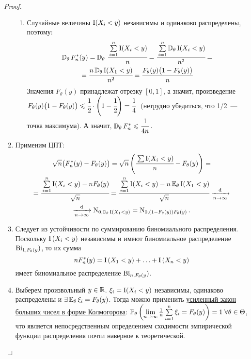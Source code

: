 \begin{proof}
\begin{enumerate}
\begin{enumerate}[label={\arabic*)}]
                \item Случайные величины $\operatorname{\mathrm{I}}(X_{i}<y)$ независимы и одинаково распределены, поэтому:
                \begin{multline*}
                    \operatorname{\mathbb{D}_{\theta}} F_{n}^{*}(y)
                    = \operatorname{\mathbb{D}_{\theta}} \, \cfrac{\sum\limits_{i=1}^{n} \operatorname{\mathrm{I}}(X_{i}<y)}{n}
                    = \cfrac{\sum\limits_{i=1}^{n} \operatorname{\mathbb{D}_{\theta}} \operatorname{\mathrm{I}}(X_{i}<y)}{n^{2}}
                    = \\
                    = \cfrac{n\operatorname{\mathbb{D}_{\theta}} \operatorname{\mathrm{I}}(X_{1}<y)}{n^{2}}
                    = \cfrac{F_{\theta}(y)\bigl(1-F_{\theta}(y)\bigr)}{n}
                \end{multline*}
                Значения $F_{\theta}(y)$ принадлежат отрезку $[0, 1]$, а значит, произведение $F_{\theta}(y)\bigl(1 - F_{\theta}(y)\bigr) \leqslant \cfrac{1}{2}\cdot\left(1 - \cfrac{1}{2}\right) = \cfrac{1}{4}~$ (нетрудно убедиться, что 1/2~--- точка максимума). 
                А значит, $\operatorname{\mathbb{D}_{\theta}} F_{n}^{*} \leqslant \cfrac{1}{4n}\,$. 
            \end{enumerate}
        \item 
            Применим ЦПТ:
            \begin{multline*}
                \sqrt{n}\bigl( F_{n}^{*}(y)-F_{\theta}(y) \bigr)
                = \sqrt{n}\left(\cfrac{\sum \operatorname{\mathrm{I}}(X_{i}<y)}{n}-F_{\theta}(y)\right) 
                = \\
                = \cfrac{\sum\limits_{i=1}^{n} \operatorname{\mathrm{I}}(X_{i}<y)-n F_{\theta}(y)}{\sqrt{n}} 
                = \cfrac{\sum\limits_{i=1}^{n} \operatorname{\mathrm{I}}(X_{i}<y)-n \operatorname{\operatorname{\mathbb{E}}_{\theta}}\operatorname{\mathrm{I}}(X_{1}<y)}{\sqrt{n}} 
                \xrightarrow[n \to \infty]{\text{d}} \\
                \xrightarrow[n \to \infty]{\text{d}} \operatorname{\mathrm{N}}_{0, \operatorname{\mathbb{D}_{\theta}}\operatorname{\mathrm{I}}(X_{1}<y)}
                = \operatorname{\mathrm{N}}_{0, (1-F_{\theta}(y))F_{\theta}(y)}.
            \end{multline*}
        \item 
            Следует из устойчивости по суммированию биномиального распределения. 
            Поскольку $\operatorname{\mathrm{I}}\left(X_{i}<y\right)$ независимы и имеют биномиальное распределение $\operatorname{\mathrm{Bi}}_{1, F_{\theta}(y})$, то их сумма
            \begin{equation*}
                n F_{n}^{*}(y)=\operatorname{\mathrm{I}}\left(X_{1}<y\right)+\ldots+\operatorname{\mathrm{I}}\left(X_{n}<y\right)
            \end{equation*}
            имеет биномиальное распределение $\operatorname{\mathrm{Bi}}_{n, F_{\theta}(y})$.
            
        \item 
            Выберем произвольный $y \in \mathbb{R}$. 
            $\xi_i = \operatorname{\mathrm{I}}(X_i < y)$ независимы, одинаково распределены и $\exists \operatorname{\operatorname{\mathbb{E}}_{\theta}} \xi_i = F_{\theta}(y)$.
            Тогда можно применить \hyperlink{SLLN}{усиленный закон больших чисел в форме Колмогорова}: ${\operatorname{\operatorname{\mathbb{P}}_{\theta}}\left(\lim\limits_{n \to \infty} \frac{1}{n} \sum\limits_{i = 1}^{n}\xi_i = F_{\theta}(y)\right) = 1} \; \forall \theta \in \Theta$, что является непосредственным определением сходимости эмпирической функции распределения почти наверное к теоретической.
    \end{enumerate}  
\end{proof}
